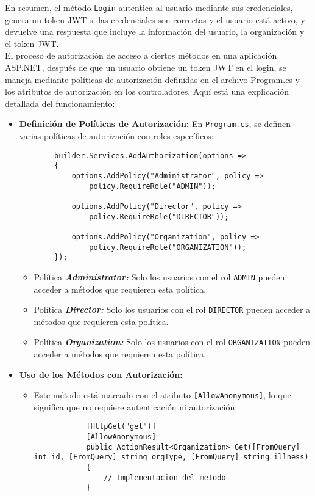 En resumen, el método \texttt{Login} autentica al usuario mediante sus
credenciales, genera un token JWT si las credenciales son correctas y el usuario
está activo, y devuelve una respuesta que incluye la información del usuario, la
organización y el token JWT.
\\
El proceso de autorización de acceso a ciertos métodos en una aplicación
ASP.NET, después de que un usuario obtiene un token JWT en el login, se maneja
mediante políticas de autorización definidas en el archivo Program.cs y los
atributos de autorización en los controladores. Aquí está una explicación
detallada del funcionamiento:
\\
\begin{itemize}
    \item \textbf{Definición de Políticas de Autorización: }En
    \texttt{Program.cs}, se definen varias políticas de autorización con roles
    específicos:
    \begin{lstlisting}
        builder.Services.AddAuthorization(options =>
        {
            options.AddPolicy("Administrator", policy =>
                policy.RequireRole("ADMIN")); 

            options.AddPolicy("Director", policy =>
                policy.RequireRole("DIRECTOR"));

            options.AddPolicy("Organization", policy => 
                policy.RequireRole("ORGANIZATION"));
        });
    \end{lstlisting}
    \begin{itemize}
        \item Política \textbf{\textit{Administrator:}} Solo los usuarios con el
        rol \texttt{ADMIN} pueden acceder a métodos que requieren esta política.
        \item Política \textbf{\textit{Director:}} Solo los usuarios con el rol
        \texttt{DIRECTOR} pueden acceder a métodos que requieren esta política.
        \item Política \textbf{\textit{Organization:}} Solo los usuarios con el
        rol \texttt{ORGANIZATION} pueden acceder a métodos que requieren esta
        política.
    \end{itemize}
    \item \textbf{Uso de los Métodos con Autorización: }
    \begin{itemize}
        \item Este método está marcado con el atributo \texttt{[AllowAnonymous]}, lo que
        significa que no requiere autenticación ni autorización:
        \begin{lstlisting}
            [HttpGet("get")]
            [AllowAnonymous]
            public ActionResult<Organization> Get([FromQuery] int id, [FromQuery] string orgType, [FromQuery] string illness)
            {
                // Implementacion del metodo
            }


\end{lstlisting}
\end{itemize}
\end{itemize}
